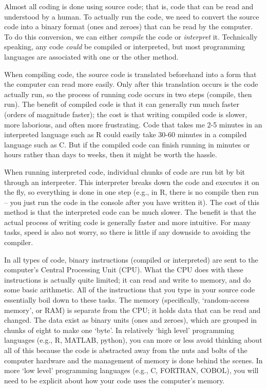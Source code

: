 \documentclass[
]{article}
\begin{document}
Almost all coding is done using source code; that is, code that can be
read and understood by a human. To actually run the code, we need to
convert the source code into a binary format (ones and zeroes) that can
be read by the computer. To do this conversion, we can either
\emph{compile} the code or \emph{interpret} it. Technically speaking,
any code \emph{could} be compiled or interpreted, but most programming
languages are associated with one or the other method.

When compiling code, the source code is translated beforehand into a
form that the computer can read more easily. Only after this translation
occurs is the code actually run, so the process of running code occurs
in two steps (compile, then run). The benefit of compiled code is that
it can generally run much faster (orders of magnitude faster); the cost
is that writing compiled code is slower, more laborious, and often more
frustrating. Code that takes me 2-5 minutes in an interpreted language
such as R could easily take 30-60 minutes in a compiled language such as
C. But if the compiled code can finish running in minutes or hours
rather than days to weeks, then it might be worth the hassle.

When running interpreted code, individual chunks of code are run bit by
bit through an interpreter. This interpreter breaks down the code and
executes it on the fly, so everything is done in one step (e.g., in R,
there is no compile then run -- you just run the code in the console
after you have written it). The cost of this method is that the
interpreted code can be much slower. The benefit is that the actual
process of writing code is generally faster and more intuitive. For many
tasks, speed is also not worry, so there is little if any downside to
avoiding the compiler.

In all types of code, binary instructions (compiled or interpreted) are
sent to the computer's Central Processing Unit (CPU). What the CPU does
with these instructions is actually quite limited; it can read and write
to memory, and do some basic arithmetic. All of the instructions that
you type in your source code essentially boil down to these tasks. The
memory (specifically, `random-access memory', or RAM) is separate from
the CPU; it holds data that can be read and changed. The data exist as
binary units (ones and zeroes), which are grouped in chunks of eight to
make one `byte'. In relatively `high level' programming languages (e.g.,
R, MATLAB, python), you can more or less avoid thinking about all of
this because the code is abstracted away from the nuts and bolts of the
computer hardware and the management of memory is done behind the
scenes. In more `low level' programming languages (e.g., C, FORTRAN,
COBOL), you will need to be explicit about how your code uses the
computer's memory.
\end{document}
